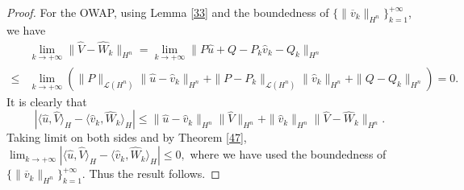 \documentclass[10pt,a4paper]{amsart}
\begin{document}
\begin{proof}
For the OWAP, using Lemma \ref{33} and the boundedness of $\{\|\overline{v}_k\|_{H^n}\}_{k=1}^{+\infty}$, we have
\begin{align}\label{42}
&\lim_{k\rightarrow+\infty}\|\widehat{V}-\widehat{W}_k\|_{H^n}
= \lim_{k\rightarrow+\infty}\|P\widehat{u}+Q-P_k\widehat{v}_k-Q_k\|_{H^n}\\   
   \leq&\lim_{k\rightarrow+\infty}(\|P\|_{\mathcal{L}(H^n)}\|\widehat{u}-\widehat{v}_k\|_{H^n}+\|P-P_k\|_{\mathcal{L}(H^n)}\|\widehat{v}_k\|_{H^n}
   +\|Q-Q_k\|_{H^n})=0.\nonumber
\end{align}
It is clearly that
$$
|\langle \widehat{u},\widehat{V}\rangle_H-\langle \widehat{v}_k,\widehat{W}_k\rangle_H|
\leq\|\widehat{u}-\widehat{v}_k\|_{H^n}\|\widehat{V}\|_{H^n}+\|\widehat{v}_k\|_{H^n}\|\widehat{V}-\widehat{W}_k\|_{H^n}.
$$
Taking limit on both sides and by Theorem \ref{47}, $\lim_{k\rightarrow+\infty}|\langle \widehat{u},\widehat{V}\rangle_H-\langle \widehat{v}_k,\widehat{W}_k\rangle_H|\leq 0,$
where we have used the  boundedness of $\{\|\overline{v}_k\|_{H^n}\}_{k=1}^{+\infty}$. Thus the result follows.
\end{proof}
\end{document}
